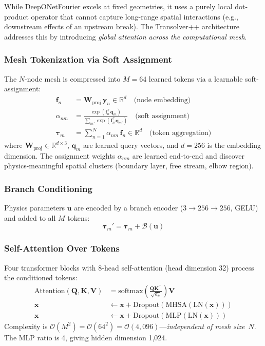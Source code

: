 \documentclass[conference]{IEEEtran}
\begin{document}
While DeepONetFourier excels at fixed geometries, it uses a purely local dot-product operator that cannot capture long-range spatial interactions (e.g., downstream effects of an upstream break). The Transolver++ architecture \cite{wu2024transolver} addresses this by introducing \emph{global attention across the computational mesh}.

\subsubsection{Mesh Tokenization via Soft Assignment}
The $N$-node mesh is compressed into $M = 64$ learned tokens via a learnable soft-assignment:
\begin{align}
\bm{f}_n &= \bm{W}_\text{proj}\,\bm{y}_n \in \mathbb{R}^{d} \quad\text{(node embedding)} \label{eq:node_embed}\\
\alpha_{nm} &= \frac{\exp(\bm{f}_n^\top \bm{q}_m)}{\sum_{m'}\exp(\bm{f}_n^\top \bm{q}_{m'})} \quad\text{(soft assignment)} \label{eq:soft_assign}\\
\bm{\tau}_m &= \sum_{n=1}^{N} \alpha_{nm}\,\bm{f}_n \in \mathbb{R}^{d} \quad\text{(token aggregation)} \label{eq:token_agg}
\end{align}
where $\bm{W}_\text{proj} \in \mathbb{R}^{d \times 3}$, $\bm{q}_m$ are learned query vectors, and $d = 256$ is the embedding dimension. The assignment weights $\alpha_{nm}$ are learned end-to-end and discover physics-meaningful spatial clusters (boundary layer, free stream, elbow region).

\subsubsection{Branch Conditioning}
Physics parameters $\bm{u}$ are encoded by a branch encoder ($3 \to 256 \to 256$, GELU) and added to all $M$ tokens:
\begin{equation}
\bm{\tau}_m' = \bm{\tau}_m + \mathcal{B}(\bm{u})
\label{eq:branch_cond}
\end{equation}

\subsubsection{Self-Attention Over Tokens}
Four transformer blocks with 8-head self-attention (head dimension 32) process the conditioned tokens:
\begin{align}
\text{Attention}(\bm{Q},\bm{K},\bm{V}) &= \text{softmax}\!\left(\frac{\bm{Q}\bm{K}^\top}{\sqrt{d_k}}\right)\bm{V} \label{eq:attn} \\
\bm{x} &\leftarrow \bm{x} + \text{Dropout}(\text{MHSA}(\text{LN}(\bm{x}))) \label{eq:res_attn} \\
\bm{x} &\leftarrow \bm{x} + \text{Dropout}(\text{MLP}(\text{LN}(\bm{x}))) \label{eq:res_mlp}
\end{align}
Complexity is $\mathcal{O}(M^2) = \mathcal{O}(64^2) = \mathcal{O}(4{,}096)$---\emph{independent of mesh size}~$N$. The MLP ratio is 4, giving hidden dimension 1,024.
\end{document}
